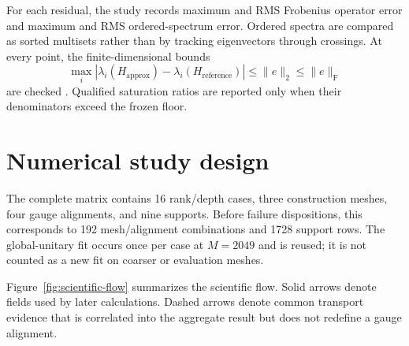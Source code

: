 \documentclass[11pt]{article}
\newcommand{\Frob}{\mathrm F}
\begin{document}
For each residual, the study records maximum and RMS Frobenius operator error and maximum
and RMS ordered-spectrum error. Ordered spectra are compared as sorted multisets rather
than by tracking eigenvectors through crossings. At every point, the finite-dimensional
bounds
\begin{equation}
 \max_i|\lambda_i(H_{\mathrm{approx}})-\lambda_i(H_{\mathrm{reference}})|
 \leq\|e\|_2\leq\|e\|_\Frob
 \label{eq:perturbation-bound}
\end{equation}
are checked \cite{hornJohnson2013}. Qualified saturation ratios are reported only when
their denominators exceed the frozen floor.

\section{Numerical study design}
\label{sec:design}

The complete matrix contains 16 rank/depth cases, three construction meshes, four gauge
alignments, and nine supports. Before failure dispositions, this corresponds to 192
mesh/alignment combinations and 1728 support rows. The global-unitary fit occurs once per
case at $M=2049$ and is reused; it is not counted as a new fit on coarser or evaluation
meshes.

Figure~\ref{fig:scientific-flow} summarizes the scientific flow. Solid arrows denote
fields used by later calculations. Dashed arrows denote common transport evidence that
is correlated into the aggregate result but does not redefine a gauge alignment.
\end{document}
